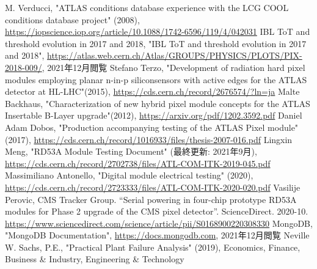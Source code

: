 \begin{thebibliography}{24}
M. Verducci, "ATLAS conditions database experience with the LCG COOL conditions database project" (2008),
\url{https://iopscience.iop.org/article/10.1088/1742-6596/119/4/042031}
IBL ToT and threshold evolution in 2017 and 2018, "IBL ToT and threshold evolution in 2017 and 2018", \url{https://atlas.web.cern.ch/Atlas/GROUPS/PHYSICS/PLOTS/PIX-2018-009/}, 2021年12月閲覧
Stefano Terzo, "Development of radiation hard pixel modules employing planar n-in-p siliconsensors with active edges for the ATLAS detector at HL-LHC"(2015), \url{https://cds.cern.ch/record/2676574/?ln=ja}
Malte Backhaus, "Characterization of new hybrid pixel module concepts for the ATLAS Insertable B-Layer upgrade"(2012), \url{https://arxiv.org/pdf/1202.3592.pdf}
Daniel Adam Dobos, "Production accompanying testing of the ATLAS Pixel module" (2017),
\url{https://cds.cern.ch/record/1016933/files/thesis-2007-016.pdf}
Lingxin Meng, "RD53A Module Testing Document" (最終更新: 2021年9月),
\url{https://cds.cern.ch/record/2702738/files/ATL-COM-ITK-2019-045.pdf}
Massimiliano Antonello, "Digital module electrical testing" (2020),
\url{https://cds.cern.ch/record/2723333/files/ATL-COM-ITK-2020-020.pdf}
Vasilije Perovic, CMS Tracker Group. “Serial powering in four-chip prototype RD53A modules for Phase 2 upgrade of the CMS pixel detector”. ScienceDirect. 2020-10. \url{https://www.sciencedirect.com/science/article/pii/S0168900220308330}
MongoDB, "MongoDB Documentation", \url{https://docs.mongodb.com}, 2021年12月閲覧
Neville W. Sachs, P.E., "Practical Plant Failure Analysis" (2019), Economics, Finance, Business \& Industry, Engineering \& Technology
\end{thebibliography}
